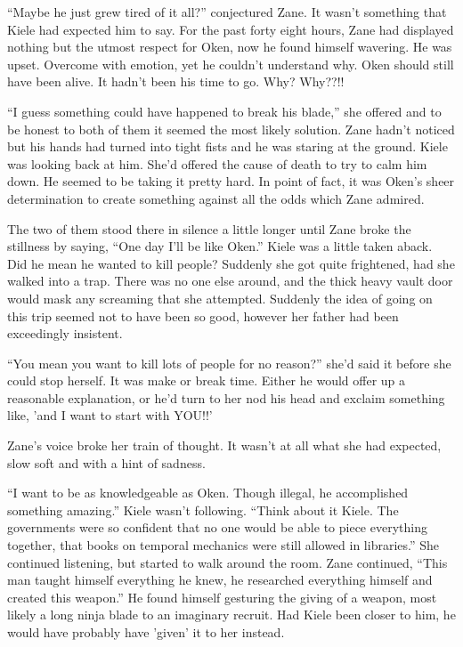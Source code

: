 ``Maybe he just grew tired of it all?'' conjectured Zane.  It wasn't something that Kiele had expected him to say.  For the past forty eight hours, Zane had displayed nothing but the utmost respect for Oken, now he found himself wavering.  He was upset.  Overcome with emotion, yet he couldn't understand why.  Oken should still have been alive.  It hadn't been his time to go.  Why?  Why??!!

``I guess something could have happened to break his blade,'' she offered and to be honest to both of them it seemed the most likely solution.  Zane hadn't noticed but his hands had turned into tight fists and he was staring at the ground.  Kiele was looking back at him.  She'd offered the cause of death to try to calm him down.  He seemed to be taking it pretty hard.  In point of fact, it was Oken's sheer determination to create something against all the odds which Zane admired.  

The two of them stood there in silence a little longer until Zane broke the stillness by saying, ``One day I'll be like Oken.''  Kiele was a little taken aback.  Did he mean he wanted to kill people?  Suddenly she got quite frightened, had she walked into a trap.  There was no one else around, and the thick heavy vault door would mask any screaming that she attempted.  Suddenly the idea of going on this trip seemed not to have been so good, however her father had been exceedingly insistent.

``You mean you want to kill lots of people for no reason?'' she'd said it before she could stop herself.  It was make or break time.  Either he would offer up a reasonable explanation, or he'd turn to her nod his head and exclaim something like, 'and I want to start with YOU!!'

Zane's voice broke her train of thought.  It wasn't at all what she had expected, slow soft and with a hint of sadness.  

``I want to be as knowledgeable as Oken.  Though illegal, he accomplished something amazing.''  Kiele wasn't following.  ``Think about it Kiele.  The governments were so confident that no one would be able to piece everything together, that books on temporal mechanics were still allowed in libraries.''  She continued listening, but started to walk around the room.  Zane continued, ``This man taught himself everything he knew, he researched everything himself and created this weapon.''  He found himself gesturing the giving of a weapon, most likely a long ninja blade to an imaginary recruit.  Had Kiele been closer to him, he would have probably have 'given' it to her instead.

